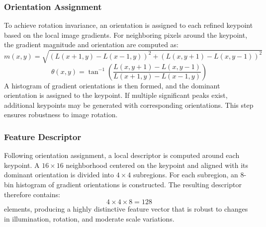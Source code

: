 \subsubsection{Orientation Assignment}
To achieve rotation invariance, an orientation is assigned to each refined keypoint based on the local image gradients.
For neighboring pixels around the keypoint, the gradient magnitude and orientation are computed as:
\begin{equation}
    m(x,y)=\sqrt{(L(x+1,y)-L(x-1,y))^2+(L(x,y+1)-L(x,y-1))^2}
\end{equation}
\begin{equation}
    \theta(x,y)=\tan^{-1} \left(\frac{L(x,y+1)-L(x,y-1)}{L(x+1,y)-L(x-1,y)}\right)
\end{equation}
A histogram of gradient orientations is then formed, and the dominant orientation is assigned to the keypoint.
If multiple significant peaks exist, additional keypoints may be generated with corresponding orientations.
This step ensures robustness to image rotation.

\subsubsection{Feature Descriptor}
Following orientation assignment, a local descriptor is computed around each keypoint.
A \(16 \times 16\) neighborhood centered on the keypoint and aligned with its dominant orientation is divided into \(4 \times 4\) subregions.
For each subregion, an 8-bin histogram of gradient orientations is constructed.
The resulting descriptor therefore contains:
\[
4 \times 4 \times 8 = 128
\]
elements, producing a highly distinctive feature vector that is robust to changes in illumination, rotation, and moderate scale variations.
